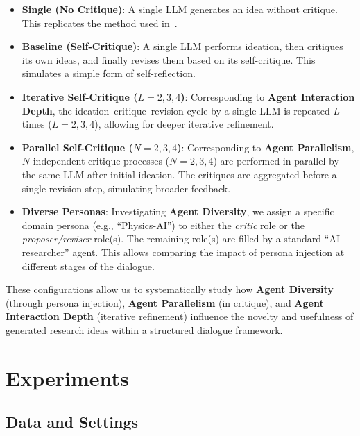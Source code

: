 \documentclass[11pt]{article}
\begin{document}
\begin{itemize}
    \item \textbf{Single (No Critique)}: A single LLM generates an idea without critique. This replicates the method used in~\citet{si2025can}.
    
    \item \textbf{Baseline (Self-Critique)}: A single LLM performs ideation, then critiques its own ideas, and finally revises them based on its self-critique. This simulates a simple form of self-reflection.
    
    \item \textbf{Iterative Self-Critique ($L=2, 3, 4$)}: Corresponding to \textbf{Agent Interaction Depth}, the ideation–critique–revision cycle by a single LLM is repeated $L$ times ($L=2, 3, 4$), allowing for deeper iterative refinement.
    
    \item \textbf{Parallel Self-Critique ($N=2, 3, 4$)}: Corresponding to \textbf{Agent Parallelism}, $N$ independent critique processes ($N=2, 3, 4$) are performed in parallel by the same LLM after initial ideation. The critiques are aggregated before a single revision step, simulating broader feedback.
    
    \item \textbf{Diverse Personas}: Investigating \textbf{Agent Diversity}, we assign a specific domain persona (e.g., ``Physics-AI'') to either the \textit{critic} role or the \textit{proposer/reviser} role(s). The remaining role(s) are filled by a standard ``AI researcher'' agent. This allows comparing the impact of persona injection at different stages of the dialogue.
\end{itemize}

These configurations allow us to systematically study how \textbf{Agent Diversity} (through persona injection), \textbf{Agent Parallelism} (in critique), and \textbf{Agent Interaction Depth} (iterative refinement) influence the novelty and usefulness of generated research ideas within a structured dialogue framework.

\section{Experiments}

\subsection{Data and Settings}
\end{document}
